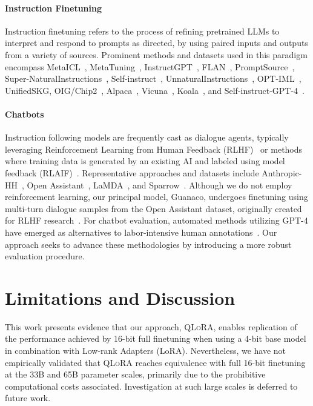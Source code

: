 \paragraph{Instruction Finetuning} Instruction finetuning refers to the process of refining pretrained LLMs to interpret and respond to prompts as directed, by using paired inputs and outputs from a variety of sources. Prominent methods and datasets used in this paradigm encompass MetaICL~\citep{min2021metaicl}, MetaTuning~\citep{zhong2021adapting}, InstructGPT~\citep{ouyang2022training}, FLAN~\citep{wei2021finetuned,chung2022scaling}, PromptSource~\citep{bach2022promptsource}, Super-NaturalInstructions~\citep{wang2022super,sanh2021multitask}, Self-instruct~\citep{wang2022self}, UnnaturalInstructions~\citep{honovich2022unnatural}, OPT-IML~\citep{iyer2022opt}, UnifiedSKG\citep{xie2022unifiedskg}, OIG/Chip2~\citep{laion2023}, Alpaca~\citep{alpaca}, Vicuna~\citep{vicuna2023}, Koala~\citep{koala_blogpost_2023}, and Self-instruct-GPT-4~\citep{peng2023instruction}.

\paragraph{Chatbots} Instruction following models are frequently cast as dialogue agents, typically leveraging Reinforcement Learning from Human Feedback (RLHF)~\citep{christiano2017deep} or methods where training data is generated by an existing AI and labeled using model feedback (RLAIF)~\citep{bai2022constitutional}. Representative approaches and datasets include Anthropic-HH~\citep{askell2021general,bai2022training}, Open Assistant~\citep{kopf2023openassistant}, LaMDA~\citep{thoppilan2022lamda}, and Sparrow~\citep{glaese2022improving}. Although we do not employ reinforcement learning, our principal model, Guanaco, undergoes finetuning using multi-turn dialogue samples from the Open Assistant dataset, originally created for RLHF research~\citep{kopf2023openassistant}. For chatbot evaluation, automated methods utilizing GPT-4 have emerged as alternatives to labor-intensive human annotations~\citep{vicuna2023,peng2023instruction}. Our approach seeks to advance these methodologies by introducing a more robust evaluation procedure.

\section{Limitations and Discussion}

This work presents evidence that our approach, \textsc{QLoRA}, enables replication of the performance achieved by 16-bit full finetuning when using a 4-bit base model in combination with Low-rank Adapters (LoRA). Nevertheless, we have not empirically validated that \textsc{QLoRA} reaches equivalence with full 16-bit finetuning at the 33B and 65B parameter scales, primarily due to the prohibitive computational costs associated. Investigation at such large scales is deferred to future work.

